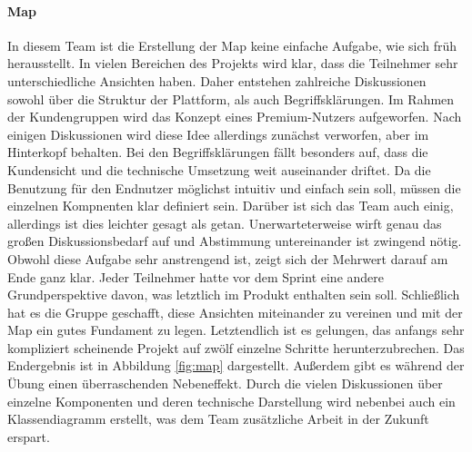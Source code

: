 \paragraph{Map}
In diesem Team ist die Erstellung der Map keine einfache Aufgabe, wie sich früh herausstellt. In vielen Bereichen des Projekts wird klar, dass die Teilnehmer sehr unterschiedliche Ansichten haben. Daher entstehen zahlreiche Diskussionen sowohl über die Struktur der Plattform, als auch Begriffsklärungen. Im Rahmen der Kundengruppen wird das Konzept eines Premium-Nutzers aufgeworfen. Nach einigen Diskussionen wird diese Idee allerdings zunächst verworfen, aber im Hinterkopf behalten. Bei den Begriffsklärungen fällt besonders auf, dass die Kundensicht und die technische Umsetzung weit auseinander driftet. Da die Benutzung für den Endnutzer möglichst intuitiv und einfach sein soll, müssen die einzelnen Kompnenten klar definiert sein. Darüber ist sich das Team auch einig, allerdings ist dies leichter gesagt als getan. Unerwarteterweise wirft genau das großen Diskussionsbedarf auf und Abstimmung untereinander ist zwingend nötig. Obwohl diese Aufgabe sehr anstrengend ist, zeigt sich der Mehrwert darauf am Ende ganz klar. Jeder Teilnehmer hatte vor dem Sprint eine andere Grundperspektive davon, was letztlich im Produkt enthalten sein soll. Schließlich hat es die Gruppe geschafft, diese Ansichten miteinander zu vereinen und mit der Map ein gutes Fundament zu legen. Letztendlich ist es gelungen, das anfangs sehr kompliziert scheinende Projekt auf zwölf einzelne Schritte herunterzubrechen. Das Endergebnis ist in Abbildung \ref{fig:map} dargestellt. Außerdem gibt es während der Übung einen überraschenden Nebeneffekt. Durch die vielen Diskussionen über einzelne Komponenten und deren technische Darstellung wird nebenbei auch ein Klassendiagramm erstellt, was dem Team zusätzliche Arbeit in der Zukunft erspart.


